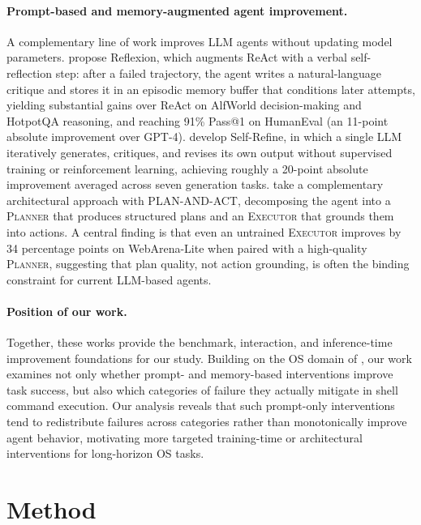 \documentclass[11pt]{article}
\begin{document}
\paragraph{Prompt-based and memory-augmented agent improvement.}
A complementary line of work improves LLM agents without updating model
parameters. \citet{shinn2023reflexion} propose Reflexion, which augments
ReAct with a verbal self-reflection step: after a failed trajectory, the
agent writes a natural-language critique and stores it in an episodic
memory buffer that conditions later attempts, yielding substantial gains
over ReAct on AlfWorld decision-making and HotpotQA reasoning, and
reaching 91\% Pass@1 on HumanEval (an 11-point absolute improvement over
GPT-4). \citet{madaan2023selfrefine} develop Self-Refine, in which a
single LLM iteratively generates, critiques, and revises its own output
without supervised training or reinforcement learning, achieving roughly
a 20-point absolute improvement averaged across seven generation tasks.
\citet{erdogan2025plan} take a complementary architectural approach with
PLAN-AND-ACT, decomposing the agent into a \textsc{Planner} that produces
structured plans and an \textsc{Executor} that grounds them into actions.
A central finding is that even an untrained \textsc{Executor} improves by
34 percentage points on WebArena-Lite when paired with a high-quality
\textsc{Planner}, suggesting that plan quality, not action grounding, is
often the binding constraint for current LLM-based agents.

\paragraph{Position of our work.}
Together, these works provide the benchmark, interaction, and
inference-time improvement foundations for our study. Building on the OS
domain of \citet{liu2023agentbench}, our work examines not only whether
prompt- and memory-based interventions improve task success, but also
which categories of failure they actually mitigate in shell command
execution. Our analysis reveals that such prompt-only interventions tend
to redistribute failures across categories rather than monotonically
improve agent behavior, motivating more targeted training-time or
architectural interventions for long-horizon OS tasks.




\section{Method}
\end{document}
